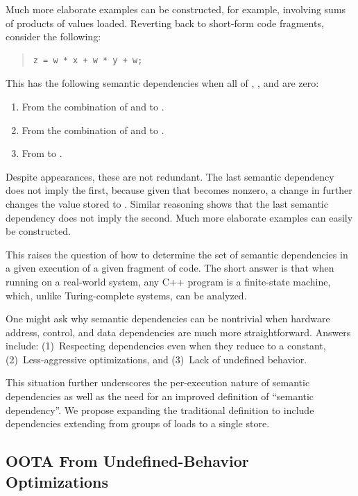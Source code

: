 \documentclass[10]{article}
\begin{document}
Much more elaborate examples can be constructed, for example,
involving sums of products of values loaded.
Reverting back to short-form code fragments, consider the following:

\begin{quote}
\begin{verbatim}
z = w * x + w * y + w;
\end{verbatim}
\end{quote}

This has the following semantic dependencies when all of ,
, and  are zero:

\begin{enumerate}
\item	From the combination of  and  to .
\item	From the combination of  and  to .
\item	From  to .
\end{enumerate}

Despite appearances, these are not redundant.
The last semantic dependency does not imply the first, because given
that  becomes nonzero, a change in  further changes
the value stored to .
Similar reasoning shows that the last semantic dependency does not
imply the second.
Much more elaborate examples can easily be constructed.

This raises the question of how to determine the set of semantic
dependencies in a given execution of a given fragment of code.
The short answer is that when running on a real-world system, 
any C++ program is a finite-state machine, which, unlike Turing-complete
systems, can be analyzed.

One might ask why semantic dependencies can be nontrivial when hardware
address, control, and data dependencies are much more straightforward.
Answers include:
(1)~Respecting dependencies even when they reduce to a constant,
(2)~Less-aggressive optimizations, and
(3)~Lack of undefined behavior.

This situation further underscores the per-execution nature of semantic
dependencies as well as the need for an improved definition of ``semantic
dependency''.
We propose expanding the traditional definition to include dependencies
extending from groups of loads to a single store.

\subsection{OOTA From Undefined-Behavior Optimizations}
\label{app:OOTA From Undefined-Behavior Optimizations}
\end{document}
